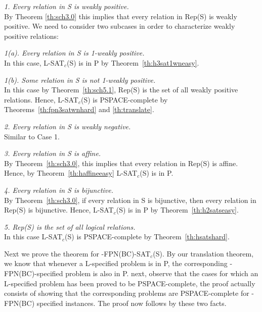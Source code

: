 \noindent
{\em 1. Every relation in {\sf S} is weakly positive.}\\
By Theorem \ref{th:sch3.0} this implies that 
every relation in {\sf Rep(S)} is weakly positive. 
We need to consider two subcases in order to characterize weakly positive
relations:

{\em  1(a). Every relation in {\sf S} is 1-weakly positive.}\\
In this case, 
{\sf L-SAT$_c$(S)} is in {\sf P} by Theorem~\ref{th:h3sat1wneasy}.

{\em   1(b). Some relation in {\sf S} is not 1-weakly positive.}\\
In this case by Theorem~\ref{th:sch5.1}, 
{\sf Rep(S)} is the set of all weakly positive relations.
Hence, {\sf L-SAT$_c$(S)} 
is {\sf PSPACE}-complete by Theorems~\ref{th:fpn3satwnhard}
and \ref{th:translate}.

\noindent
{\em 2. Every relation in {\sf S} is weakly negative.}\\
Similar to Case 1.

\noindent
{\em 3. Every relation in {\sf S} is affine.}\\
By Theorem~\ref{th:sch3.0}, this implies that
every relation in {\sf Rep(S)} is affine. Hence, 
by Theorem~\ref{th:haffineeasy}
{\sf L-SAT$_c$(S)} is in {\sf P}. 

\noindent
{\em 4.  Every relation in {\sf S} is bijunctive.}\\
By Theorem~\ref{th:sch3.0}, if every relation in {\sf S} is bijunctive,
then every relation in {\sf Rep(S)} is bijunctive. Hence, {\sf L-SAT$_c$(S)} 
is in {\sf P}  by Theorem~\ref{th:h2satseasy}.

\noindent
{\em 5. {\sf Rep(S)} is the set of all logical relations.}\\
In this case {\sf L-SAT$_c$(S)} 
is {\sf PSPACE}-complete by Theorem~\ref{th:hsatshard}.


Next we prove the theorem for {-FPN(BC)-SAT$_c$(S)}.
By our translation theorem, we know that whenever a {\sf L}-specified
problem is in {\sf P}, the corresponding {-FPN(BC)}-specified problem 
is also in {\sf P}.
next, observe that the cases for which an L-specified problem has been
proved to be {\sf PSPACE}-complete, the proof actually consists of showing that
the corresponding problems are {\sf PSPACE}-complete for {-FPN(BC)} 
specified instances. The proof now follows by these two facts.\\



